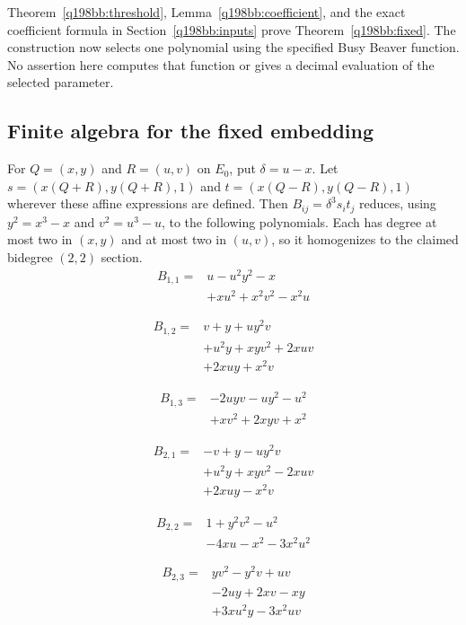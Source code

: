 Theorem~\ref{q198bb:threshold}, Lemma~\ref{q198bb:coefficient}, and the exact
coefficient formula in Section~\ref{q198bb:inputs} prove
Theorem~\ref{q198bb:fixed}. The construction now selects one polynomial
using the specified Busy Beaver function. No assertion here computes
that function or gives a decimal evaluation of the selected parameter.


\subsection{Finite algebra for the fixed embedding}\label{q198bb:finite-algebra}
For $Q=(x,y)$ and $R=(u,v)$ on $E_0$, put $\delta=u-x$.
Let $s=(x(Q+R),y(Q+R),1)$ and
$t=(x(Q-R),y(Q-R),1)$ wherever these affine expressions are defined.
Then $B_{ij}=\delta^3s_it_j$ reduces, using $y^2=x^3-x$ and
$v^2=u^3-u$, to the following polynomials. Each has degree at most
two in $(x,y)$ and at most two in $(u,v)$, so it homogenizes to the
claimed bidegree $(2,2)$ section.
\[
\begin{aligned}
B_{1,1}={}&u-u^{2}y^{2}-x\\
&+xu^{2}+x^{2}v^{2}-x^{2}u
\end{aligned}
\]

\[
\begin{aligned}
B_{1,2}={}&v+y+uy^{2}v\\
&+u^{2}y+xyv^{2}+2xuv\\
&+2xuy+x^{2}v
\end{aligned}
\]

\[
\begin{aligned}
B_{1,3}={}&-2uyv-uy^{2}-u^{2}\\
&+xv^{2}+2xyv+x^{2}
\end{aligned}
\]

\[
\begin{aligned}
B_{2,1}={}&-v+y-uy^{2}v\\
&+u^{2}y+xyv^{2}-2xuv\\
&+2xuy-x^{2}v
\end{aligned}
\]

\[
\begin{aligned}
B_{2,2}={}&1+y^{2}v^{2}-u^{2}\\
&-4xu-x^{2}-3x^{2}u^{2}
\end{aligned}
\]

\[
\begin{aligned}
B_{2,3}={}&yv^{2}-y^{2}v+uv\\
&-2uy+2xv-xy\\
&+3xu^{2}y-3x^{2}uv
\end{aligned}
\]


